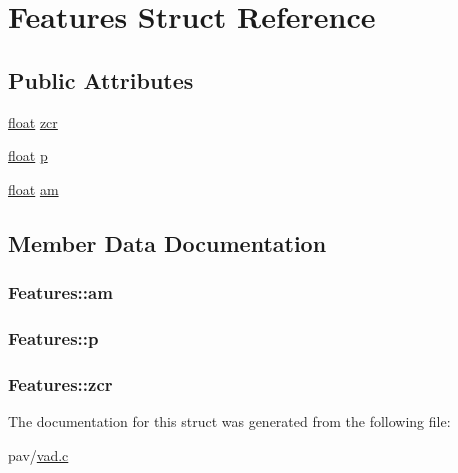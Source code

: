 \hypertarget{structFeatures}{}\section{Features Struct Reference}
\label{structFeatures}
\subsection*{Public Attributes}
\begin{DoxyCompactItemize}
\item 
\hyperlink{FFTReal__readme_8txt_a0ea2fae2a8106200bf378b90eae003cf}{float} \hyperlink{structFeatures_a02006441e52641420bcac6b7adffc660}{zcr}
\item 
\hyperlink{FFTReal__readme_8txt_a0ea2fae2a8106200bf378b90eae003cf}{float} \hyperlink{structFeatures_a7ab66b5f9a14d82c41e411873d3ef425}{p}
\item 
\hyperlink{FFTReal__readme_8txt_a0ea2fae2a8106200bf378b90eae003cf}{float} \hyperlink{structFeatures_a767255b0011e02ba7edc937e69805dd4}{am}
\end{DoxyCompactItemize}


\subsection{Member Data Documentation}
\subsubsection[{\texorpdfstring{am}{am}}]{ Features\+::am}\hypertarget{structFeatures_a767255b0011e02ba7edc937e69805dd4}{}\label{structFeatures_a767255b0011e02ba7edc937e69805dd4}
\subsubsection[{\texorpdfstring{p}{p}}]{ Features\+::p}\hypertarget{structFeatures_a7ab66b5f9a14d82c41e411873d3ef425}{}\label{structFeatures_a7ab66b5f9a14d82c41e411873d3ef425}
\subsubsection[{\texorpdfstring{zcr}{zcr}}]{ Features\+::zcr}\hypertarget{structFeatures_a02006441e52641420bcac6b7adffc660}{}\label{structFeatures_a02006441e52641420bcac6b7adffc660}


The documentation for this struct was generated from the following file\+:\begin{DoxyCompactItemize}
\item 
pav/\hyperlink{vad_8c}{vad.\+c}\end{DoxyCompactItemize}
